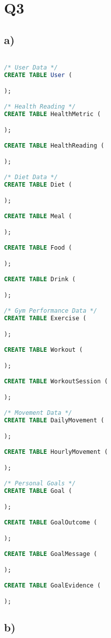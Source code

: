 \documentclass{article}
\begin{document}
\pagebreak

\section*{Q3}

\subsection*{\small a)}

\begin{lstlisting}[language=sql]

/* User Data */
CREATE TABLE User (

);

/* Health Reading */
CREATE TABLE HealthMetric (

);

CREATE TABLE HealthReading (

);

/* Diet Data */
CREATE TABLE Diet (

);

CREATE TABLE Meal (

);

CREATE TABLE Food (

);

CREATE TABLE Drink (

);

/* Gym Performance Data */
CREATE TABLE Exercise (

);

CREATE TABLE Workout (

);

CREATE TABLE WorkoutSession (

);

/* Movement Data */
CREATE TABLE DailyMovement (

);

CREATE TABLE HourlyMovement (

);

/* Personal Goals */
CREATE TABLE Goal (

);

CREATE TABLE GoalOutcome (

);

CREATE TABLE GoalMessage (

);

CREATE TABLE GoalEvidence (

);
\end{lstlisting}


\subsection*{\small b)}
\end{document}
